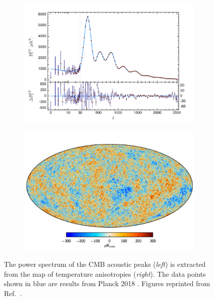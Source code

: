 \begin{figure}[!ht]
     \centering
     \begin{subfigure}{0.49\textwidth}
         \centering
         \includegraphics[width=\textwidth]{figures/DMOverview/coadded_TT.pdf}
         \caption{}
         \label{fig:DMOverview/CMBPowerSpec}
     \end{subfigure}
     \hfill
     \begin{subfigure}{0.49\textwidth}
         \centering
         \includegraphics[width=\textwidth]{figures/DMOverview/CMBImg.png}
         \caption{}
         \label{fig:DMOverview/CMBImg}
     \end{subfigure}
     \caption[The power spectrum of the CMB acoustic peaks is extracted from the map of temperature anisotropies.]{The power spectrum of the CMB acoustic peaks (\textit{left}) is extracted from the map of temperature anisotropies (\textit{right}). The data points shown in blue are results from Planck 2018 \cite{Planck:2018vyg}. Figures reprinted from Ref.~\cite{Cirelli:2024ssz,Planck:2018vyg}.}
     \label{fig:DMOverview/CMB}
\end{figure}
